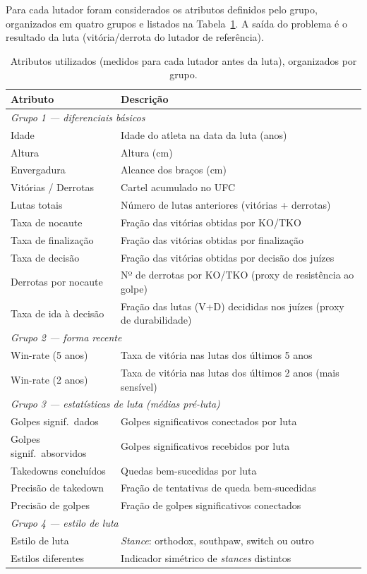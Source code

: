 \documentclass[10pt]{article}
\begin{document}
Para cada lutador foram considerados os atributos definidos pelo grupo,
organizados em quatro grupos e listados na Tabela~\ref{tab:atributos}. A saída
do problema é o resultado da luta (vitória/derrota do lutador de referência).

\begin{table}[t]
\centering
\caption{Atributos utilizados (medidos para cada lutador antes da luta),
organizados por grupo.}
\label{tab:atributos}
\begin{tabular}{ll}
\toprule
Atributo & Descrição \\
\midrule
\multicolumn{2}{l}{\emph{Grupo 1 --- diferenciais básicos}} \\
\midrule
Idade & Idade do atleta na data da luta (anos) \\
Altura & Altura (cm) \\
Envergadura & Alcance dos braços (cm) \\
Vitórias / Derrotas & Cartel acumulado no UFC \\
Lutas totais & Número de lutas anteriores (vitórias + derrotas) \\
Taxa de nocaute & Fração das vitórias obtidas por KO/TKO \\
Taxa de finalização & Fração das vitórias obtidas por finalização \\
Taxa de decisão & Fração das vitórias obtidas por decisão dos juízes \\
Derrotas por nocaute & Nº de derrotas por KO/TKO (proxy de resistência ao golpe) \\
Taxa de ida à decisão & Fração das lutas (V+D) decididas nos juízes (proxy de durabilidade) \\
\midrule
\multicolumn{2}{l}{\emph{Grupo 2 --- forma recente}} \\
\midrule
Win-rate (5 anos) & Taxa de vitória nas lutas dos últimos 5 anos \\
Win-rate (2 anos) & Taxa de vitória nas lutas dos últimos 2 anos (mais sensível) \\
\midrule
\multicolumn{2}{l}{\emph{Grupo 3 --- estatísticas de luta (médias pré-luta)}} \\
\midrule
Golpes signif.\ dados & Golpes significativos conectados por luta \\
Golpes signif.\ absorvidos & Golpes significativos recebidos por luta \\
Takedowns concluídos & Quedas bem-sucedidas por luta \\
Precisão de takedown & Fração de tentativas de queda bem-sucedidas \\
Precisão de golpes & Fração de golpes significativos conectados \\
\midrule
\multicolumn{2}{l}{\emph{Grupo 4 --- estilo de luta}} \\
\midrule
Estilo de luta & \emph{Stance}: orthodox, southpaw, switch ou outro \\
Estilos diferentes & Indicador simétrico de \emph{stances} distintos \\
\bottomrule
\end{tabular}
\end{table}
\end{document}
